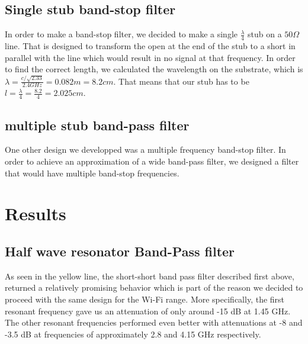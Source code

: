 \documentclass[letterpaper, 11pt, twocolumn]{article}
\begin{document}

\subsection{Single stub band-stop filter}
In order to make a band-stop filter, we decided to make a single \(\frac{\lambda}{4}\) stub on a \(50 \Omega\) line. That is designed to transform the open at the end of the stub to a short in parallel with the line which would result in no signal at that frequency. In order to find the correct length, we calculated the wavelength on the substrate, which is \(\lambda=\frac{c/\sqrt{2.33}}{2.4GHz}=0.082m=8.2cm\). That means that our stub has to be \(l=\frac{\lambda}{4}=\frac{8.2}{4}=2.025cm\).
\subsection{multiple stub band-pass filter}
One other design we developped was a multiple frequency band-stop filter. In order to achieve an approximation of a wide band-pass filter, we designed a filter that would have multiple band-stop frequencies. 
\section{Results}

\subsection{Half wave resonator Band-Pass filter}
As seen in the yellow line, the short-short band pass filter described first above, returned a relatively promising behavior which is part of the reason we decided to proceed with the same design for the Wi-Fi range. More specifically, the first resonant frequency gave us an attenuation of only around -15 dB at 1.45 GHz. The other resonant frequencies performed even better with attenuations at -8 and -3.5 dB at frequencies of approximately 2.8 and 4.15 GHz respectively.
\end{document}
